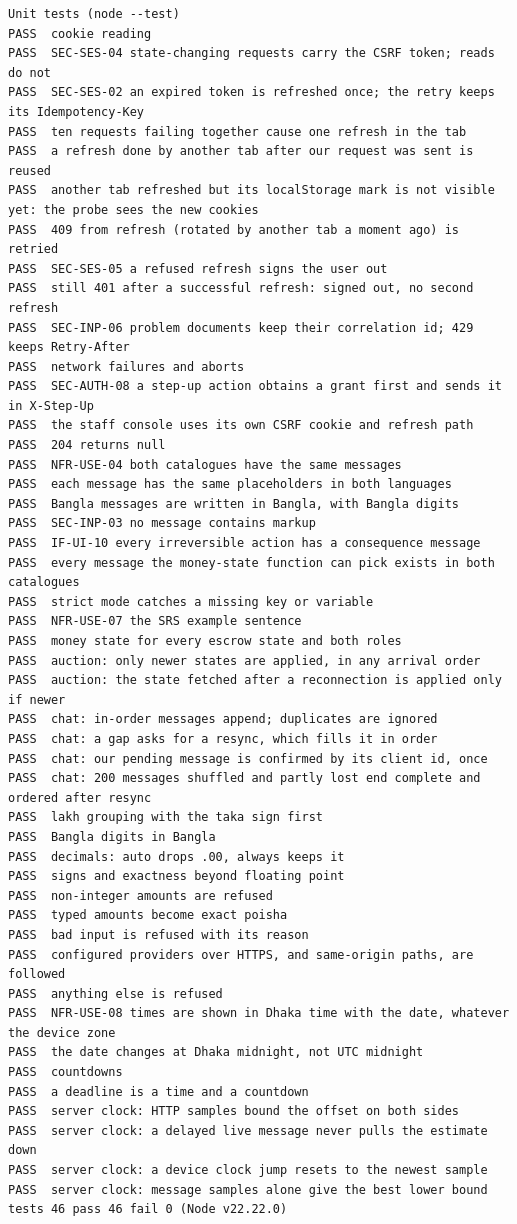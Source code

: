\documentclass[11pt,a4paper]{article}
\begin{document}
{\scriptsize
\begin{verbatim}
Unit tests (node --test)
PASS  cookie reading
PASS  SEC-SES-04 state-changing requests carry the CSRF token; reads do not
PASS  SEC-SES-02 an expired token is refreshed once; the retry keeps its Idempotency-Key
PASS  ten requests failing together cause one refresh in the tab
PASS  a refresh done by another tab after our request was sent is reused
PASS  another tab refreshed but its localStorage mark is not visible yet: the probe sees the new cookies
PASS  409 from refresh (rotated by another tab a moment ago) is retried
PASS  SEC-SES-05 a refused refresh signs the user out
PASS  still 401 after a successful refresh: signed out, no second refresh
PASS  SEC-INP-06 problem documents keep their correlation id; 429 keeps Retry-After
PASS  network failures and aborts
PASS  SEC-AUTH-08 a step-up action obtains a grant first and sends it in X-Step-Up
PASS  the staff console uses its own CSRF cookie and refresh path
PASS  204 returns null
PASS  NFR-USE-04 both catalogues have the same messages
PASS  each message has the same placeholders in both languages
PASS  Bangla messages are written in Bangla, with Bangla digits
PASS  SEC-INP-03 no message contains markup
PASS  IF-UI-10 every irreversible action has a consequence message
PASS  every message the money-state function can pick exists in both catalogues
PASS  strict mode catches a missing key or variable
PASS  NFR-USE-07 the SRS example sentence
PASS  money state for every escrow state and both roles
PASS  auction: only newer states are applied, in any arrival order
PASS  auction: the state fetched after a reconnection is applied only if newer
PASS  chat: in-order messages append; duplicates are ignored
PASS  chat: a gap asks for a resync, which fills it in order
PASS  chat: our pending message is confirmed by its client id, once
PASS  chat: 200 messages shuffled and partly lost end complete and ordered after resync
PASS  lakh grouping with the taka sign first
PASS  Bangla digits in Bangla
PASS  decimals: auto drops .00, always keeps it
PASS  signs and exactness beyond floating point
PASS  non-integer amounts are refused
PASS  typed amounts become exact poisha
PASS  bad input is refused with its reason
PASS  configured providers over HTTPS, and same-origin paths, are followed
PASS  anything else is refused
PASS  NFR-USE-08 times are shown in Dhaka time with the date, whatever the device zone
PASS  the date changes at Dhaka midnight, not UTC midnight
PASS  countdowns
PASS  a deadline is a time and a countdown
PASS  server clock: HTTP samples bound the offset on both sides
PASS  server clock: a delayed live message never pulls the estimate down
PASS  server clock: a device clock jump resets to the newest sample
PASS  server clock: message samples alone give the best lower bound
tests 46 pass 46 fail 0 (Node v22.22.0)


\end{verbatim}}
\end{document}
